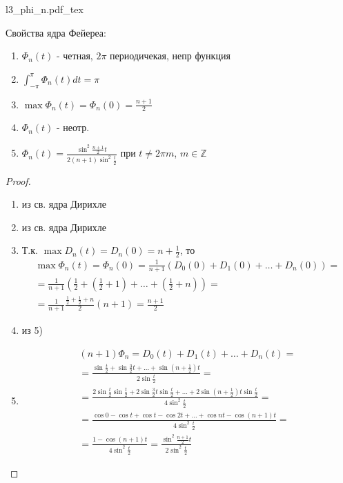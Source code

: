 \documentclass{article}
\newcommand{\incfig}[2][1]{%
    \def\svgwidth{#1\columnwidth}
    \hbox{{#2.pdf_tex}}
}
\theoremstyle{definition}
\numberwithin{theorem}{section}
\numberwithin{lemma}{section}
\numberwithin{definition}{section}
\numberwithin{corollary}{section}
\numberwithin{equation}{section}
\begin{document}
\incfig{l3_phi_n}
Свойства ядра Фейереа:
\begin{enumerate}
  \item $\Phi_n(t)$ - четная, $2\pi$ периодичекая, непр функция
  \item $\int_{-\pi}^{\pi}\Phi_n(t)dt=\pi$
  \item $\max \Phi_n(t)=\Phi_n(0)=\frac{n+1}{2}$
  \item $\Phi_n(t)$ - неотр.
  \item $\Phi_n(t)=\frac{\sin^{2}\frac{n+1}{2}t}{2(n+1)\sin^{2}\frac{t}{2}}$
    при $t\neq 2\pi m$, $m\in \mathbb{Z}$
\end{enumerate}
\begin{proof} \phantom{.}

  \begin{enumerate}
    \item из св. ядра Дирихле
    \item из св. ядра Дирихле
    \item Т.к. $\max D_n(t)=D_n(0)=n+\frac{1}{2}$, то
      \begin{gather*}
        \max \Phi_n(t)=\Phi_n(0)=\frac{1}{n+1}(D_0(0)+D_1(0)+\dots +D_n(0))= \\
        =\frac{1}{n+1}\left(\frac{1}{2}+\left(\frac{1}{2}+1\right)+\dots +\left(\frac{1}{2}+n\right)\right)= \\
        =\frac{1}{n+1}\frac{\frac{1}{2}+\frac{1}{2}+n}{2}(n+1)=\frac{n+1}{2}
      \end{gather*}
    \item из 5)
    \item
      \begin{gather*}
        (n+1)\Phi_n=D_0(t)+D_1(t)+\dots +D_n(t)=\\
        =\frac{\sin \frac{t}{2}+\sin \frac{3}{2}t + \dots +\sin(n+\frac{1}{2})t}{2\sin \frac{t}{2}} = \\
        =\frac{2\sin \frac{t}{2} \sin \frac{t}{2}+2\sin\frac{3}{2}t\sin\frac{t}{2}+\dots +2\sin(n+\frac{1}{2})t\sin\frac{t}{2}}{4\sin^{2}\frac{t}{2}} = \\
        =\frac{\cos 0 - \cos t + \cos t - \cos 2t +\dots + \cos nt - \cos (n+1)t}{4\sin^{2}\frac{t}{2}} = \\ 
        =\frac{1-\cos (n+1)t}{4\sin^{2}\frac{t}{2}}=\frac{\sin^{2}\frac{n+1}{2}t}{2\sin^{2}\frac{t}{2}}
      \end{gather*}
  \end{enumerate}
\end{proof}

\end{document}
